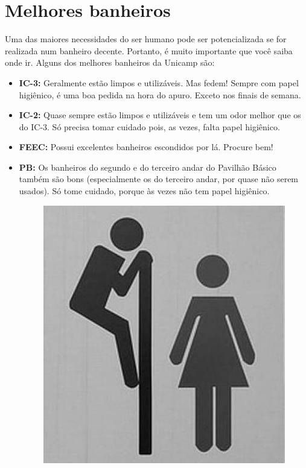 
\section{Melhores banheiros}

Uma das maiores necessidades do ser humano pode ser potencializada se for
realizada num banheiro decente. Portanto, é muito importante que você saiba onde
ir. Alguns dos melhores banheiros da Unicamp são:

\begin{itemize}
    \item  \textbf{IC-3:} Geralmente estão limpos e utilizáveis. Mas fedem!
        Sempre com papel higiênico, é uma boa pedida na hora do apuro. Exceto
        nos finais de semana.

    \item  \textbf{IC-2:} Quase sempre estão limpos e utilizáveis e tem um odor
        melhor que os do IC-3. Só precisa tomar cuidado pois, as vezes, falta
        papel higiênico.

    \item  \textbf{FEEC:} Possui excelentes banheiros escondidos por lá. Procure
        bem!

    \item  \textbf{PB:} Os banheiros do segundo e do terceiro andar do Pavilhão
        Básico também são bons (especialmente os do terceiro andar, por quase
        não serem usados). Só tome cuidado, porque às vezes não tem papel
        higiênico.

        \begin{figure}[h!]
            \centering
            \includegraphics[scale=0.50, keepaspectratio=true]{img/imgs/12-melhores_banheiros/banheiro.jpg}
        \end{figure}


\end{itemize}
